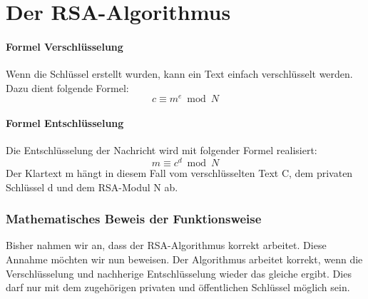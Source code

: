 \part{Der RSA-Algorithmus}
%

%

%
\subsection{Formel Verschlüsselung}
Wenn die Schlüssel erstellt wurden, kann ein Text einfach verschlüsselt werden.\\
Dazu dient folgende Formel:
%
\begin{equation}
  c \equiv m^e  \bmod N
  \label{eqn:rsa_encription}
\end{equation}
%

\subsection{Formel Entschlüsselung}
Die Entschlüsselung der Nachricht wird mit folgender Formel realisiert:
%
\begin{equation}
  m \equiv c^d \bmod N
  \label{eqn:rsa_decription}
\end{equation}
%
Der Klartext m hängt in diesem Fall vom verschlüsselten Text C, dem privaten Schlüssel d und dem RSA-Modul N ab. 
%
%
\newpage
\section{Mathematisches Beweis der Funktionsweise}
Bisher nahmen wir an, dass der RSA-Algorithmus korrekt arbeitet. Diese Annahme möchten wir nun beweisen. Der Algorithmus arbeitet korrekt, wenn die Verschlüsselung und nachherige Entschlüsselung wieder das gleiche ergibt. Dies darf nur mit dem zugehörigen privaten und öffentlichen Schlüssel möglich sein.

